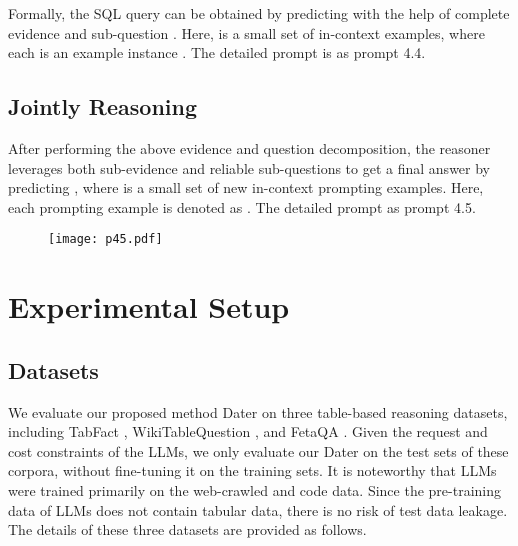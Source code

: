\documentclass{article}
\begin{document}
Formally, the SQL query  can be obtained by predicting  with the help of complete evidence  and sub-question . Here, 
 is a small set of in-context examples, where each  is an example instance .
The detailed prompt is as prompt 4.4.


\subsection{Jointly Reasoning}
After performing the above evidence and question decomposition, the reasoner leverages both sub-evidence  and reliable sub-questions  to get a final answer  by predicting , where  is a small set of new in-context prompting examples. Here, each prompting example is denoted as .
The detailed prompt as prompt 4.5.
\begin{figure}
    \centering
    \texttt{[image: p45.pdf]}
    \label{p45}
\end{figure}

\section{Experimental Setup}



\subsection{Datasets}
We evaluate our proposed method Dater on three table-based reasoning datasets, including TabFact \citep{tabfact}, WikiTableQuestion \citep{wtq}, and FetaQA \citep{fetaqa}. 
Given the request and cost constraints of the LLMs, we only evaluate our Dater on the test sets of these corpora, without fine-tuning it on the training sets. 
It is noteworthy that LLMs were trained primarily on the web-crawled and code data. 
Since the pre-training data of LLMs does not contain tabular data, there is no risk of test data leakage. 
The details of these three datasets are provided as follows.
\end{document}
